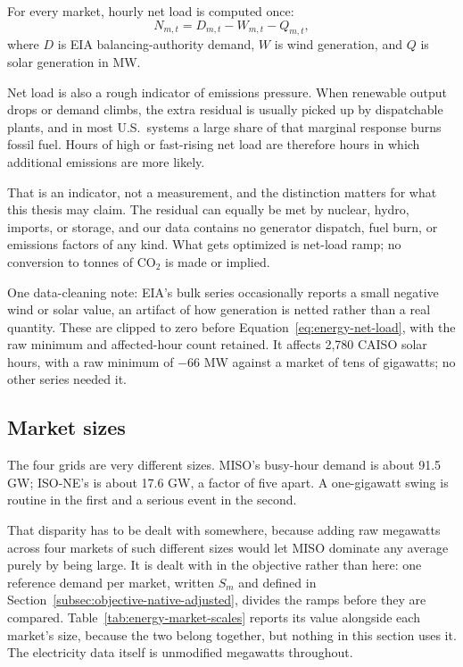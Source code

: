 ﻿\documentclass[12pt]{article}
\begin{document}
For every market, hourly net load is computed once:
\begin{equation}
  N_{m,t}
  =
  D_{m,t} - W_{m,t} - Q_{m,t},
  \label{eq:energy-net-load}
\end{equation}
where \(D\) is EIA balancing-authority demand, \(W\) is wind generation, and
\(Q\) is solar generation in MW.

Net load is also a rough indicator of emissions pressure. When renewable output
drops or demand climbs, the extra residual is usually picked up by dispatchable
plants, and in most U.S.\ systems a large share of that marginal response burns
fossil fuel. Hours of high or fast-rising net load are therefore hours in which
additional emissions are more likely.

That is an indicator, not a measurement, and the distinction matters for what
this thesis may claim. The residual can equally be met by nuclear, hydro,
imports, or storage, and our data contains no generator dispatch, fuel burn, or
emissions factors of any kind. What gets optimized is net-load ramp; no
conversion to tonnes of \(\mathrm{CO_2}\) is made or implied.

One data-cleaning note: EIA's bulk series occasionally reports a small negative
wind or solar value, an artifact of how generation is netted rather than a real
quantity. These are clipped to zero before
Equation~\eqref{eq:energy-net-load}, with the raw minimum and affected-hour
count retained. It affects 2,780 CAISO solar hours, with a raw minimum of
\(-66\) MW against a market of tens of gigawatts; no other series needed it.

\subsection{Market sizes}
\label{subsec:energy-scales}

The four grids are very different sizes. MISO's busy-hour demand is about
91.5 GW; ISO-NE's is about 17.6 GW, a factor of five apart. A one-gigawatt swing
is routine in the first and a serious event in the second.

That disparity has to be dealt with somewhere, because adding raw megawatts
across four markets of such different sizes would let MISO dominate any average
purely by being large. It is dealt with in the objective rather than here: one
reference demand per market, written \(S_m\) and defined in
Section~\ref{subsec:objective-native-adjusted}, divides the ramps before they
are compared. Table~\ref{tab:energy-market-scales} reports its value alongside
each market's size, because the two belong together, but nothing in this section
uses it. The electricity data itself is unmodified megawatts throughout.
\end{document}
